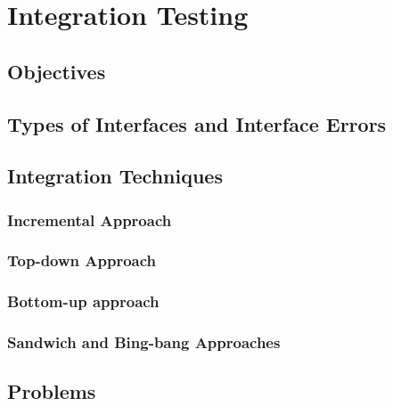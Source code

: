 \chapter{Integration Testing}
\section{Objectives}
\section{Types of Interfaces and Interface Errors}
\section{Integration Techniques}
\subsection{Incremental Approach}
\subsection{Top-down Approach}
\subsection{Bottom-up approach}
\subsection{Sandwich and Bing-bang Approaches}
\section{Problems}